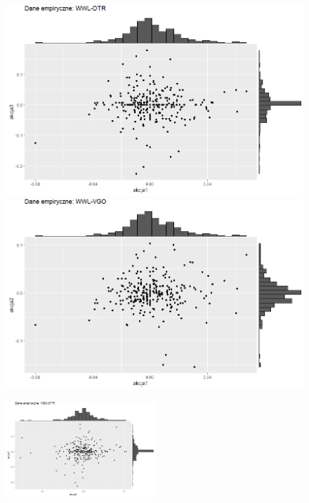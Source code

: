 \documentclass[a4paper,11pt]{article}
\begin{document}
\begin{figure}[!htb]
  \includegraphics[width=\linewidth]{./img/dane empiryczne-wwl-dtr.png}
\endminipage\hfill
{}
  \includegraphics[width=\linewidth]{./img/dane empiryczne-wwl-vgo.png}
\endminipage\hfill
\end{figure}
\begin{figure}[H]
    \centering
    \includegraphics[width=0.5\textwidth]{./img/dane empiryczne-vgo-dtr.png}
\end{figure}
\end{document}
